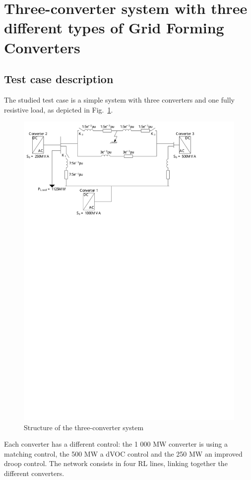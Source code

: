 \documentclass[a4paper, 12pt]{report}
\begin{document}
\chapter*{Three-converter system with three different types of Grid Forming Converters}
\section*{Test case description}
The studied test case is a simple system with three converters and one fully resistive load, as depicted in Fig.~\ref{ThreeConv}.
\begin{figure}[H]
\begin{center}
\includegraphics[width=\textwidth]{ThreeConvISGT}
\end{center}
\caption{Structure of the three-converter system\label{ThreeConv}}
\end{figure}
Each converter has a different control: the 1 000 MW converter is using a matching control, the 500 MW a dVOC control and the 250 MW an improved droop control. The network consists in four RL lines, linking together the different converters.
\end{document}
